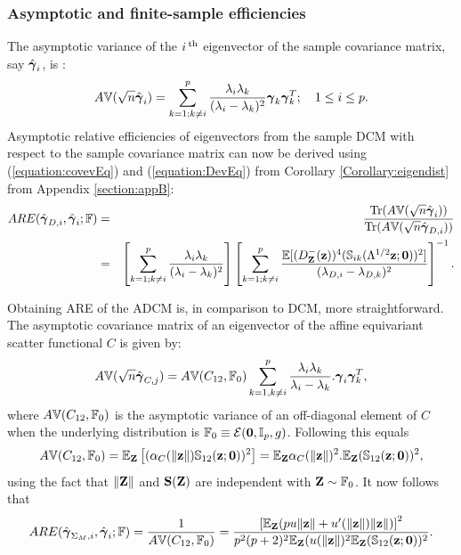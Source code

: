 \subsubsection{Asymptotic and finite-sample efficiencies}

The asymptotic variance of the $i\operatorname*{^{\text{th}}}$ eigenvector of the sample covariance matrix, say $\hat {{\boldsymbol{\gamma}}}_i$, is \citep{anderson}:
%
\begin{equation} \label{equation:covevEq}
A{\mathbb{V}}( \sqrt n\hat {{\boldsymbol{\gamma}}}_{i}) = \sum_{k=1; k \neq i}^p \frac{\lambda_i \lambda_k}{(\lambda_i - \lambda_k)^2} {\boldsymbol{\gamma}}_k {\boldsymbol{\gamma}}_k^T; \quad
1 \leq i \leq p.
\end{equation}
%
Asymptotic relative efficiencies of eigenvectors from the sample DCM with respect to the sample covariance matrix can now be derived using (\ref{equation:covevEq}) and (\ref{equation:DevEq}) from Corollary \ref{Corollary:eigendist} from Appendix \ref{section:appB}:
%
\begin{eqnarray*}
ARE(\hat{{\boldsymbol{\gamma}}}_{D,i}, \hat{{\boldsymbol{\gamma}}}_i; {\mathbb{F}}) &=& \frac{\operatorname*{Tr}( A{\mathbb{V}} ( \sqrt n\hat {{\boldsymbol{\gamma}}}_i))}{\operatorname*{Tr}( A{\mathbb{V}}(\sqrt n\hat {{\boldsymbol{\gamma}}}_{D,i}))}\\
&=& \left[\sum_{k=1; k \neq i}^p \frac{\lambda_i \lambda_k}{(\lambda_i - \lambda_k)^2} \right] \left[ \sum_{k=1; k \neq i}^p
\frac{{\mathbb{E}} [ (D^-_{\mathbf{Z}} ({\bf{z}}))^4 ({\mathbb{S}}_{ik} (\Lambda^{1/2} {\bf{z}}; {\bf 0}))^2 ]}{(\lambda_{D,i} - \lambda_{D,k})^2} \right]^{-1}.
\end{eqnarray*}

Obtaining ARE of the ADCM is, in comparison to DCM, more straightforward. The asymptotic covariance matrix of an eigenvector of the affine equivariant scatter functional $C$ is given by:
%
$$
A{\mathbb{V}} (\sqrt n  \hat{{\boldsymbol{\gamma}}}_{C,j}) = A{\mathbb{V}} (C_{12}, {\mathbb{F}}_0) \sum_{k=1, k \neq i}^p \frac{\lambda_i \lambda_k}{\lambda_i - \lambda_k}. {\boldsymbol{\gamma}}_i {\boldsymbol{\gamma}}_k^T,
$$
%
where $A{\mathbb{V}} (C_{12}, {\mathbb{F}}_0)$ is the asymptotic variance of an off-diagonal element of $C$ when the underlying distribution is ${\mathbb{F}}_0 \equiv \mathcal{E}({\bf 0}, {\mathbb{I}}_p, g)$. Following \cite{croux00} this equals
%
$$
A{\mathbb{V}} (C_{12}, {\mathbb{F}}_0) = {\mathbb{E}}_{{\mathbf{Z}}} \left[ (\alpha_C (\| {\bf{z}} \|) {\mathbb{S}}_{12} ({\bf{z}}; {\bf 0}))^2 \right] = {\mathbb{E}}_{{\mathbf{Z}}} \alpha_C (\| {\bf{z}} \|)^2 . {\mathbb{E}}_{{\mathbf{Z}}} ({\mathbb{S}}_{12}({\bf{z}}; {\bf 0}))^2,
$$
% 
using the fact that $\|{\mathbf{Z}}\|$ and ${\mathbf{S}}({\mathbf{Z}})$ are independent with ${\mathbf{Z}} \sim {\mathbb{F}}_0$. It now follows that
%
\begin{equation}
ARE (\hat{{\boldsymbol{\gamma}}}_{\Sigma_M,i}, \hat{{\boldsymbol{\gamma}}}_{i}; {\mathbb{F}}) =
\frac{1}{A{\mathbb{V}} (C_{12}, {\mathbb{F}}_0)} = \frac{\left[ {\mathbb{E}}_{{\mathbf{Z}}} ( p u \| {\bf{z}}\| + u'( \| {\bf{z}} \|) \| {\bf{z}} \| ) \right]^2}
{p^2 (p+2)^2 {\mathbb{E}}_{\mathbf{Z}} (u (\| {\bf{z}} \|)^2 {\mathbb{E}}_{{\mathbf{Z}}} ({\mathbb{S}}_{12}({\bf{z}}; {\bf 0}))^2}.
\end{equation}
%

